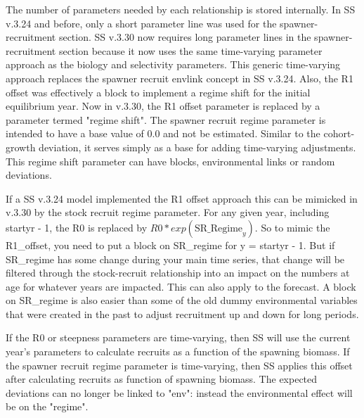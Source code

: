 The number of parameters needed by each relationship is stored internally. In SS v.3.24 and before, only a short parameter line was used for the spawner-recruitment section. SS v.3.30 now requires long parameter lines in the spawner-recruitment section because it now uses the same time-varying parameter approach as the biology and selectivity parameters. This generic time-varying approach replaces the spawner recruit envlink concept in SS v.3.24.  Also, the R1 offset was effectively a block to implement a regime shift for the initial equilibrium year.  Now in v.3.30, the R1 offset parameter is replaced by a parameter termed "regime shift". The spawner recruit regime parameter is intended to have a base value of 0.0 and not be estimated.  Similar to the cohort-growth deviation, it serves simply as a base for adding time-varying adjustments. This regime shift parameter can have blocks, environmental links or random deviations. 

If a SS v.3.24 model implemented the R1 offset approach this can be mimicked in v.3.30 by the stock recruit regime parameter. For any given year, including startyr - 1, the R0 is replaced by $R0*exp(\mathrm{SR\_Regime}_y)$. So to mimic the R1\_offset, you need to put a block on SR\_regime for y = startyr - 1. But if SR\_regime has some change during your main time series, that change will be filtered through the stock-recruit relationship into an impact on the numbers at age for whatever years are impacted. This can also apply to the forecast. A block on SR\_regime is also easier than some of the old dummy environmental variables that were created in the past to adjust recruitment up and down for long periods.

If the R0 or steepness parameters are time-varying, then SS will use the current year's parameters to calculate recruits as a function of the spawning biomass. If the spawner recruit regime parameter is time-varying, then SS applies this offset after calculating recruits as function of spawning biomass.  The expected deviations can no longer be linked to "env": instead the environmental effect will be on the "regime". 


